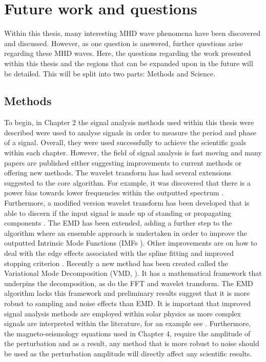 \section{Future work and questions}

	Within this thesis, many interesting MHD wave phenomena have been discovered and discussed.
    However, as one question is answered, further questions arise regarding these MHD waves.
    Here, the questions regarding the work presented within this thesis and the regions that can be expanded upon in the future will be detailed.
    This will be split into two parts: Methods and Science.
    
    \subsection{Methods}

	To begin, in Chapter 2 the signal analysis methods used within this thesis were described were used to analyse signals in order to measure the period and phase of a signal.
	Overall, they were used successfully to achieve the scientific goals within each chapter.
	However, the field of signal analysis is fast moving and many papers are published either suggesting improvements to current methods or offering new methods.
    The wavelet transform has had several extensions suggested to the core algorithm.
    For example, it was discovered that there is a power bias towards lower frequencies within the outputted spectrum \citep{liu2007rectification,veleda2012cross}.
    Furthermore, a modified version wavelet transform has been developed that is able to discern if the input signal is made up of standing or propagating components \citep{2008SoPh..248..395S}.
    The EMD has been extended, adding a further step to the algorithm where an ensemble approach is undertaken in order to improve the outputted Intrinsic Mode Functions (IMFs \citealt{wu2009ensemble}).
    Other improvements are on how to deal with the edge effects associated with the spline fitting \citep{zeng2004simple} and improved stopping criterion \citep{huang2008review}.
    Recently a new method has been created called the Variational Mode Decomposition (VMD, \citealt{6655981}).
    It has a mathematical framework that underpins the decomposition, as do the FFT and wavelet transform.
    The EMD algorithm lacks this framework and preliminary results suggest that it is more robust to sampling and noise effects than EMD.
    It is important that improved signal analysis methods are employed within solar physics as more complex signals are interpreted within the literature, for an example see \cite{refId0}. 
    Furthermore, the magneto-seismology equations used in Chapter 4, require the amplitude of the perturbation and as a result, any method that is more robust to noise should be used as the perturbation amplitude will directly affect any scientific results.
    
